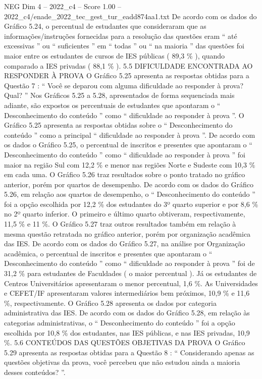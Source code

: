 \begin{textsample}{NEG Dim 4 – 2022\_c4 – Score 1.00 – 2022\_c4/enade\_2022\_tec\_gest\_tur\_eadd874aa1.txt}
De acordo com os dados do Gráfico 5.24, o percentual de estudantes que consideraram que as informações/instruções fornecidas para a resolução das questões eram “ até excessivas ” ou “ suficientes ” em “ todas ” ou “ na maioria ” das questões foi maior entre os estudantes de cursos de IES públicas ( 89,3 \% ), quando comparado a IES privadas ( 88,1 \% ). 5.5 DIFICULDADE ENCONTRADA AO RESPONDER À PROVA O Gráfico 5.25 apresenta as respostas obtidas para a Questão 7 : “ Você se deparou com alguma dificuldade ao responder à prova?
Qual? ” Nos Gráficos 5.25 a 5.28, apresentados de forma sequenciada mais adiante, são expostos os percentuais de estudantes que apontaram o “ Desconhecimento do conteúdo ” como “ dificuldade ao responder à prova ”.
O Gráfico 5.25 apresenta as respostas obtidas sobre o “ Desconhecimento do conteúdo ” como a principal “ dificuldade ao responder à prova ”.
De acordo com os dados o Gráfico 5.25, o percentual de inscritos e presentes que apontaram o “ Desconhecimento do conteúdo ” como “ dificuldade ao responder à prova ” foi maior na região Sul com 12,2 \% e menor nas regiões Norte e Sudeste com 10,3 \% em cada uma.
O Gráfico 5.26 traz resultados sobre o ponto tratado no gráfico anterior, porém por quartos de desempenho.
De acordo com os dados do Gráfico 5.26, em relação aos quartos de desempenho, o “ Desconhecimento do conteúdo ” foi a opção escolhida por 12,2 \% dos estudantes do 3º quarto superior e por 8,6 \% no 2º quarto inferior.
O primeiro e último quarto obtiveram, respectivamente, 11,5 \% e 11 \%.
O Gráfico 5.27 traz outros resultados também em relação à mesma questão retratada no gráfico anterior, porém por organização acadêmica das IES.
De acordo com os dados do Gráfico 5.27, na análise por Organização acadêmica, o percentual de inscritos e presentes que apontaram o “ Desconhecimento do conteúdo ” como “ dificuldade ao responder à prova ” foi de 31,2 \% para estudantes de Faculdades ( o maior percentual ).
Já os estudantes de Centros Universitários apresentaram o menor percentual, 1,6 \%.
As Universidades e CEFET/IF apresentaram valores intermediários bem próximos, 10,9 \% e 11,6 \%, respectivamente.
O Gráfico 5.28 apresenta os dados por categoria administrativa das IES.
De acordo com os dados do Gráfico 5.28, em relação às categorias administrativas, o “ Desconhecimento do conteúdo ” foi a opção escolhida por 10,8 \% dos estudantes, nas IES públicas, e nas IES privadas, 10,9 \%. 5.6 CONTEÚDOS DAS QUESTÕES OBJETIVAS DA PROVA O Gráfico 5.29 apresenta as respostas obtidas para a Questão 8 : “ Considerando apenas as questões objetivas da prova, você percebeu que não estudou ainda a maioria desses conteúdos? ”.

\end{textsample}
